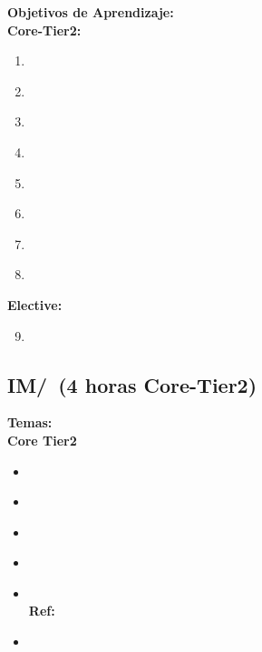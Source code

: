 \noindent \textbf{Objetivos de Aprendizaje:}\\
\noindent \textbf{Core-Tier2:}
\begin{enumerate}
	\setcounter{enumi}{0}
	\item \IMDatabaseSystemsLOExplainTheDistinguish\xspace[\IMDatabaseSystemsLOExplainTheDistinguishLevel]\label{sec:BOK:IMDatabaseSystemsLOExplainTheDistinguish}
	\item \IMDatabaseSystemsLODescribeTheDesigns\xspace[\IMDatabaseSystemsLODescribeTheDesignsLevel]\label{sec:BOK:IMDatabaseSystemsLODescribeTheDesigns}
	\item \IMDatabaseSystemsLOCite\xspace[\IMDatabaseSystemsLOCiteLevel]\label{sec:BOK:IMDatabaseSystemsLOCite}
	\item \IMDatabaseSystemsLODescribeTheA\xspace[\IMDatabaseSystemsLODescribeTheALevel]\label{sec:BOK:IMDatabaseSystemsLODescribeTheA}
	\item \IMDatabaseSystemsLOIdentifyMajor\xspace[\IMDatabaseSystemsLOIdentifyMajorLevel]\label{sec:BOK:IMDatabaseSystemsLOIdentifyMajor}
	\item \IMDatabaseSystemsLOExplainTheData\xspace[\IMDatabaseSystemsLOExplainTheDataLevel]\label{sec:BOK:IMDatabaseSystemsLOExplainTheData}
	\item \IMDatabaseSystemsLOUseALanguage\xspace[\IMDatabaseSystemsLOUseALanguageLevel]\label{sec:BOK:IMDatabaseSystemsLOUseALanguage}
	\item \IMDatabaseSystemsLODescribeFacilities\xspace[\IMDatabaseSystemsLODescribeFacilitiesLevel]\label{sec:BOK:IMDatabaseSystemsLODescribeFacilities}
\end{enumerate}
\noindent \textbf{Elective:}
\begin{enumerate}
	\setcounter{enumi}{8}
	\item \IMDatabaseSystemsLODescribeMajor\xspace[\IMDatabaseSystemsLODescribeMajorLevel]\label{sec:BOK:IMDatabaseSystemsLODescribeMajor}
\end{enumerate}


\subsection{IM/\IMDataModeling~(4 horas Core-Tier2)}\label{sec:BOK:IMDataModeling}
\noindent \textbf{Temas:}\\
\noindent \textbf{Core Tier2}
\begin{itemize}
	\item \IMDataModelingTopicData\label{sec:BOK:IMDataModelingTopicData}
	\item \IMDataModelingTopicConceptual\label{sec:BOK:IMDataModelingTopicConceptual}
	\item \IMDataModelingTopicSpreadsheet\label{sec:BOK:IMDataModelingTopicSpreadsheet}
	\item \IMDataModelingTopicRelational\label{sec:BOK:IMDataModelingTopicRelational}
	\item \IMDataModelingTopicObject\xspace \\ \textbf{Ref:} \label{sec:BOK:IMDataModelingTopicObject}
	\item \IMDataModelingTopicSemi\label{sec:BOK:IMDataModelingTopicSemi}
\end{itemize}


